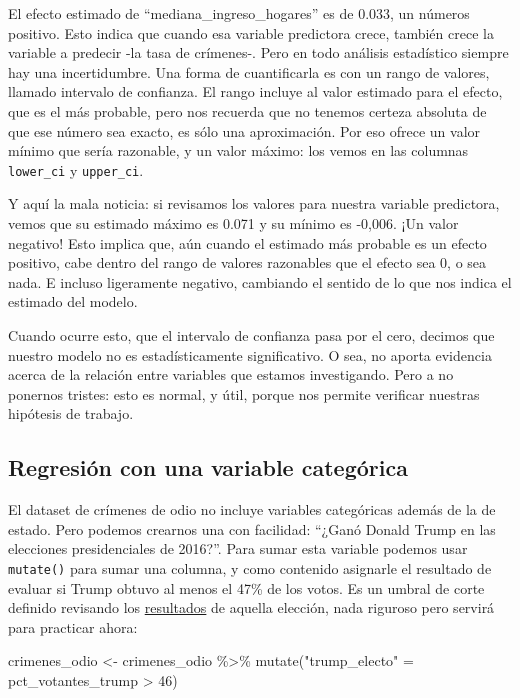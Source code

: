 \documentclass[
]{book}
\newenvironment{Shaded}{\begin{snugshade}}{\end{snugshade}}
\newcommand{\DecValTok}[1]{\textcolor[rgb]{0.00,0.00,0.81}{#1}}
\newcommand{\FunctionTok}[1]{\textcolor[rgb]{0.00,0.00,0.00}{#1}}
\newcommand{\NormalTok}[1]{#1}
\newcommand{\OtherTok}[1]{\textcolor[rgb]{0.56,0.35,0.01}{#1}}
\newcommand{\SpecialCharTok}[1]{\textcolor[rgb]{0.00,0.00,0.00}{#1}}
\newcommand{\StringTok}[1]{\textcolor[rgb]{0.31,0.60,0.02}{#1}}
\begin{document}
El efecto estimado de ``mediana\_ingreso\_hogares'' es de 0.033, un números positivo. Esto indica que cuando esa variable predictora crece, también crece la variable a predecir -la tasa de crímenes-. Pero en todo análisis estadístico siempre hay una incertidumbre. Una forma de cuantificarla es con un rango de valores, llamado intervalo de confianza. El rango incluye al valor estimado para el efecto, que es el más probable, pero nos recuerda que no tenemos certeza absoluta de que ese número sea exacto, es sólo una aproximación. Por eso ofrece un valor mínimo que sería razonable, y un valor máximo: los vemos en las columnas \texttt{lower\_ci} y \texttt{upper\_ci}.

Y aquí la mala noticia: si revisamos los valores para nuestra variable predictora, vemos que su estimado máximo es 0.071 y su mínimo es -0,006. ¡Un valor negativo! Esto implica que, aún cuando el estimado más probable es un efecto positivo, cabe dentro del rango de valores razonables que el efecto sea 0, o sea nada. E incluso ligeramente negativo, cambiando el sentido de lo que nos indica el estimado del modelo.

Cuando ocurre esto, que el intervalo de confianza pasa por el cero, decimos que nuestro modelo no es estadísticamente significativo. O sea, no aporta evidencia acerca de la relación entre variables que estamos investigando. Pero a no ponernos tristes: esto es normal, y útil, porque nos permite verificar nuestras hipótesis de trabajo.

\hypertarget{regresiuxf3n-con-una-variable-categuxf3rica}{%
\subsection{Regresión con una variable categórica}\label{regresiuxf3n-con-una-variable-categuxf3rica}}

El dataset de crímenes de odio no incluye variables categóricas además de la de estado. Pero podemos crearnos una con facilidad: ``¿Ganó Donald Trump en las elecciones presidenciales de 2016?''. Para sumar esta variable podemos usar \texttt{mutate()} para sumar una columna, y como contenido asignarle el resultado de evaluar si Trump obtuvo al menos el 47\% de los votos. Es un umbral de corte definido revisando los \href{https://www.nytimes.com/elections/2016/results/president}{resultados} de aquella elección, nada riguroso pero servirá para practicar ahora:

\begin{Shaded}
\begin{Highlighting}[]
\NormalTok{crimenes\_odio }\OtherTok{\textless{}{-}}\NormalTok{ crimenes\_odio }\SpecialCharTok{\%\textgreater{}\%} 
  \FunctionTok{mutate}\NormalTok{(}\StringTok{"trump\_electo"} \OtherTok{=}\NormalTok{ pct\_votantes\_trump }\SpecialCharTok{\textgreater{}} \DecValTok{46}\NormalTok{)}
\end{Highlighting}
\end{Shaded}
\end{document}
